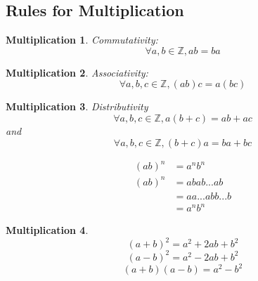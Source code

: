 \subsection{Rules for Multiplication}
\newtheorem{multiplication}{Multiplication}[section]
\begin{multiplication}
Commutativity:
\[
\forall a, b \in \mathbb{Z}, ab = ba
\]
\end{multiplication}
\begin{multiplication}
Associativity:
\[
\forall a, b, c \in \mathbb{Z}, (ab)c = a(bc)
\]
\end{multiplication}
\begin{multiplication}
Distributivity
\[
\forall a, b, c \in \mathbb{Z}, a(b + c) = ab + ac
\]
and
\[
\forall a, b, c \in \mathbb{Z}, (b + c)a = ba + bc
\]
\end{multiplication}
\begin{example}
\begin{align*}
(ab)^n &= a^nb^n \\
(ab)^n &= abab...ab \\
 &= aa...abb...b \\
 &=a^nb^n
\end{align*}
\end{example}
\begin{multiplication}
\[
(a + b)^2 = a^2 + 2ab + b^2
\]
\[
(a - b)^2 = a^2 - 2ab + b^2
\]
\[
(a + b)(a - b) = a^2 - b^2
\]
\end{multiplication}
